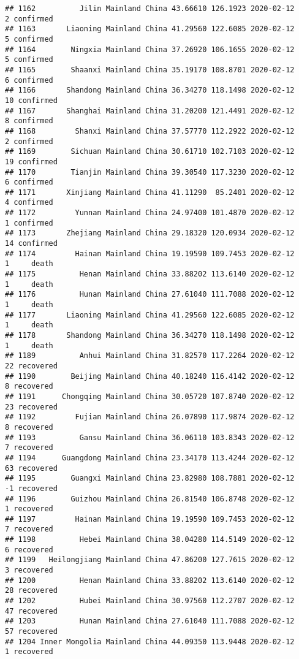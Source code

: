 \documentclass[
]{article}
\begin{document}
\begin{verbatim}
## 1162          Jilin Mainland China 43.66610 126.1923 2020-02-12     2 confirmed
## 1163       Liaoning Mainland China 41.29560 122.6085 2020-02-12     5 confirmed
## 1164        Ningxia Mainland China 37.26920 106.1655 2020-02-12     5 confirmed
## 1165        Shaanxi Mainland China 35.19170 108.8701 2020-02-12     6 confirmed
## 1166       Shandong Mainland China 36.34270 118.1498 2020-02-12    10 confirmed
## 1167       Shanghai Mainland China 31.20200 121.4491 2020-02-12     8 confirmed
## 1168         Shanxi Mainland China 37.57770 112.2922 2020-02-12     2 confirmed
## 1169        Sichuan Mainland China 30.61710 102.7103 2020-02-12    19 confirmed
## 1170        Tianjin Mainland China 39.30540 117.3230 2020-02-12     6 confirmed
## 1171       Xinjiang Mainland China 41.11290  85.2401 2020-02-12     4 confirmed
## 1172         Yunnan Mainland China 24.97400 101.4870 2020-02-12     1 confirmed
## 1173       Zhejiang Mainland China 29.18320 120.0934 2020-02-12    14 confirmed
## 1174         Hainan Mainland China 19.19590 109.7453 2020-02-12     1     death
## 1175          Henan Mainland China 33.88202 113.6140 2020-02-12     1     death
## 1176          Hunan Mainland China 27.61040 111.7088 2020-02-12     1     death
## 1177       Liaoning Mainland China 41.29560 122.6085 2020-02-12     1     death
## 1178       Shandong Mainland China 36.34270 118.1498 2020-02-12     1     death
## 1189          Anhui Mainland China 31.82570 117.2264 2020-02-12    22 recovered
## 1190        Beijing Mainland China 40.18240 116.4142 2020-02-12     8 recovered
## 1191      Chongqing Mainland China 30.05720 107.8740 2020-02-12    23 recovered
## 1192         Fujian Mainland China 26.07890 117.9874 2020-02-12     8 recovered
## 1193          Gansu Mainland China 36.06110 103.8343 2020-02-12     7 recovered
## 1194      Guangdong Mainland China 23.34170 113.4244 2020-02-12    63 recovered
## 1195        Guangxi Mainland China 23.82980 108.7881 2020-02-12    -1 recovered
## 1196        Guizhou Mainland China 26.81540 106.8748 2020-02-12     1 recovered
## 1197         Hainan Mainland China 19.19590 109.7453 2020-02-12     7 recovered
## 1198          Hebei Mainland China 38.04280 114.5149 2020-02-12     6 recovered
## 1199   Heilongjiang Mainland China 47.86200 127.7615 2020-02-12     3 recovered
## 1200          Henan Mainland China 33.88202 113.6140 2020-02-12    28 recovered
## 1202          Hubei Mainland China 30.97560 112.2707 2020-02-12    47 recovered
## 1203          Hunan Mainland China 27.61040 111.7088 2020-02-12    57 recovered
## 1204 Inner Mongolia Mainland China 44.09350 113.9448 2020-02-12     1 recovered

\end{verbatim}
\end{document}
